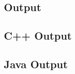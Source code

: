 \documentclass[11pt]{article}
\begin{document}
\subsection{Output}

\subsection{C++ Output}



\subsection{Java Output}



\end{document}
